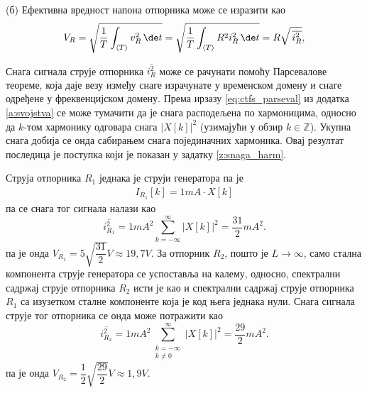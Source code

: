 (б) Ефективна вредност напона отпорника може се изразити као 
\begin{eqnarray}
    V_R = \sqrt{ \dfrac{1}{T} \int_{\langle T \rangle} v_R^2  \, \de t  }
        = \sqrt{ \dfrac{1}{T} \int_{\langle T \rangle} R^2 i_R^2  \, \de t  }
        = R \sqrt{ \, \overline{i_R^2} },
\end{eqnarray}

Снага сигнала струје отпорника $\overline{i_R^2}$ може се рачунати помоћу Парсевалове теореме, која даје везу између снаге 
израчунате у временском домену и снаге одређене у фреквенцијском домену. Према ирзазу \ref{eq:ctfs_parseval} из додатка 
\ref{a:svojstva} се може тумачити да је снага расподељена по хармоницима, односно да $k$-том хармонику одговара 
снага $|X[k]|^2$ (узимајући у обзир $k \in \mathbb Z$). Укупна снага добија се онда сабирањем снага појединачних хармоника. 
Овај резултат последица је поступка који је показан у задатку
\ref{z:snaga_harm}.

Струја
отпорника $R_1$ једнака је струји генератора па је 
\begin{eqnarray}
    I_{R_1}[k] = 1\unit{mA} \cdot X[k]
\end{eqnarray}
па се снага тог сигнала налази као 
\begin{equation}
    \overline{i_{R_1}^2} = 1 \unit{mA^2} \sum_{k = -\infty}^{\infty} |X[k]|^2 = \dfrac{31}{2} \unit{mA^2}.
\end{equation}
па је онда $V_{R_1} = 5 \sqrt{\dfrac{31}{2}} \unit{V} \approx 19,7 \unit{V}$. За отпорник $R_2$, пошто је $L \to \infty$, само 
стална компонента струје генератора се успоставља на калему, односно, спектрални садржај струје отпорника 
$R_2$ исти је као и спектрални садржај струје отпорника $R_1$ са изузетком сталне компоненте која је код 
њега једнака нули. Снага сигнала струје тог отпорника се онда може потражити као
\begin{equation}
    \overline{i_{R_2}^2} = 1 \unit{mA^2} \sum_{ \substack{k = -\infty\\k\neq 0}}^{\infty} |X[k]|^2 = \dfrac{29}{2} \unit{mA^2}.
\end{equation}
па је онда $V_{R_2} = \dfrac{1}{2} \sqrt{ \dfrac{29}{2} } \unit{V} \approx 1,9 \unit{V}$.